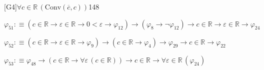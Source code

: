 \begin{fullproof}{[G4]}{$\forall c \in \mathbb{R}\,(\mathrm{Conv}(\overline{c},c))$}{148}
\begin{abbrevlist}
\item $\varphi_{51} :\equiv (c \in \mathbb{R} \to \varepsilon \in \mathbb{R} \to 0 < \varepsilon \to \varphi_{12}) \to (\varphi_{8} \to \neg \varphi_{12}) \to c \in \mathbb{R} \to \varepsilon \in \mathbb{R} \to \varphi_{24}$
\item $\varphi_{52} :\equiv (c \in \mathbb{R} \to \varepsilon \in \mathbb{R} \to \varphi_{9}) \to (c \in \mathbb{R} \to \varphi_{4}) \to \varphi_{29} \to c \in \mathbb{R} \to \varphi_{22}$
\item $\varphi_{53} :\equiv \varphi_{48} \to (c \in \mathbb{R} \to \forall \varepsilon\,(c \in \mathbb{R})) \to c \in \mathbb{R} \to \forall \varepsilon \in \mathbb{R}\,(\varphi_{24})$
\end{abbrevlist}
\end{fullproof}
